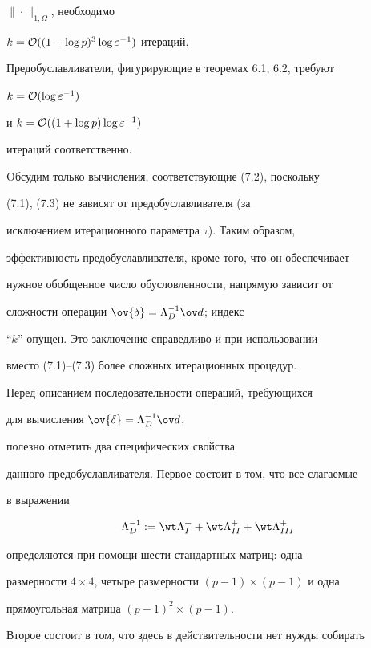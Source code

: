 $\|\cdot\|_{1,\Omega}$, необходимо 


$k={\cal O}((1+\log p)^3\log {\varepsilon}^{-1})$ итераций. 


Предобуславливатели, фигурирующие в теоремах 6.1, 6.2, требуют 


$k={\cal O}(\log {\varepsilon} ^{-1})$


и $k={\cal O}((1+\log p)\log {\varepsilon}^{-1})$ 


итераций соответственно. 


Oбсудим только вычисления, соответствующие (7.2), поскольку 


(7.1), (7.3) не зависят от предобуславливателя (за 


исключением итерационного параметра $\tau$). Таким образом, 


эффективность предобуславливателя, кроме того, что он обеспечивает 


нужное обобщенное число обусловленности, напрямую зависит от 


сложности операции $\ov {\delta}={\Lambda}^{-1}_D \ov d$; индекс 


``$k$'' опущен. Это заключение справедливо и при использовании 


вместо (7.1)--(7.3) более сложных итерационных процедур. 





Перед описанием последовательности операций, требующихся 


для вычисления $\ov {\delta}={\Lambda}^{-1}_D \ov d$,


полезно отметить два специфических свойства


данного предобуславливателя. Первое состоит в том, что все слагаемые 


в выражении


\begin{equation} 


\Lambda^{-1}_D:=\wt \Lambda^{+}_I+\wt \Lambda^+_{II}+


\wt \Lambda^+_{III}


\end{equation}


определяются при помощи шести стандартных матриц: одна


размерности $4 \times 4$, четыре размерности $(p-1)\times(p-1)$ и одна 


прямоугольная матрица $(p-1)^2 \times (p-1)$. 


Второе состоит в том, что здесь в действительности нет нужды собирать 


